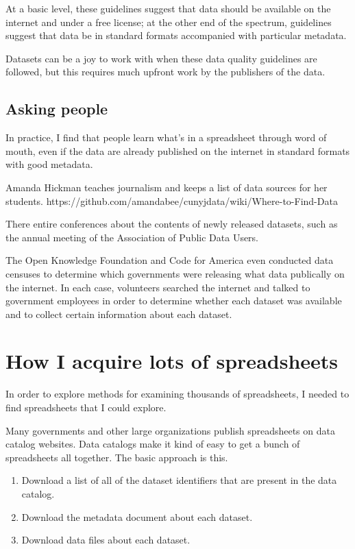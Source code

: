 \documentclass{acm_proc_article-sp}
\begin{document}
At a basic level, these guidelines suggest that data should
be available on the internet and under a free license; at the other
end of the spectrum, guidelines suggest that data be in standard
formats accompanied with particular metadata.

Datasets can be a joy to work with when these data quality guidelines
are followed, but this requires much upfront work by the publishers
of the data.

\subsection{Asking people}
In practice, I find that people learn what's in a spreadsheet through word
of mouth, even if the data are already published on the internet in standard
formats with good metadata.

Amanda Hickman teaches journalism and keeps a list of data sources for her
students. \cite{amanda}
https://github.com/amandabee/cunyjdata/wiki/Where-to-Find-Data

There entire conferences about the contents of newly released datasets,
such as the annual meeting of the Association of Public Data Users.\cite{apdu}

The Open Knowledge Foundation \cite{open-data-census}
and Code for America \cite{open-data-census-us}
even conducted data censuses to determine which governments were
releasing what data publically on the internet.
In each case, volunteers searched the internet and talked to
government employees in order to determine whether each dataset was
available and to collect certain information about each dataset.

\section{How I acquire lots of spreadsheets} \label{acquire}
In order to explore methods for examining thousands of spreadsheets,
I needed to find spreadsheets that I could explore.

Many governments and other large organizations publish spreadsheets on
data catalog websites.
Data catalogs make it kind of easy to get a bunch of spreadsheets all together.
The basic approach is this.

\begin{enumerate}
\item Download a list of all of the dataset identifiers that are present in the data catalog.
\item Download the metadata document about each dataset.
\item Download data files about each dataset.
\end{enumerate}
\end{document}
